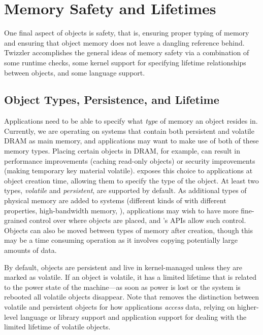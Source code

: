 \section{Memory Safety and Lifetimes}

One final aspect of objects is safety, that is, ensuring proper typing of memory and ensuring that object memory does
not leave a dangling reference behind. Twizzler accomplishes the general ideas of memory safety via a combination of
some runtime checks, some kernel support for specifying lifetime relationships between objects, and some language
support.

\subsection{Object Types, Persistence, and Lifetime}

Applications need to be able to specify what \emph{type} of memory an object resides in. Currently,
we are operating on systems that contain both persistent \NVM and volatile DRAM as main memory, and
applications may want to make use of both of these memory types. Placing certain objects in DRAM,
for example, can result in performance improvements (\eg caching read-only objects) or security
improvements (\eg making temporary key material volatile). \Twizzler exposes this choice to
applications at object creation time, allowing them to specify the type of the object. At least two
types, \emph{volatile} and \emph{persistent}, are supported by default. As additional types of physical memory
are added to systems (\eg different kinds of \NVM with different properties, high-bandwidth memory,
\etc), applications may wish to have more fine-grained control over where objects are placed, and
\Twizzler's APIs allow such control. Objects can also be moved between types of memory after
creation, though this may be a time consuming operation as it involves copying potentially large
amounts of data.

By default, objects are persistent and live in kernel-managed \NVM unless they are marked as
volatile. If an object is volatile, it has a limited lifetime that is related to the power state of
the machine---as soon as power is lost or the system is rebooted all volatile objects disappear.
Note that \Twizzler removes the distinction between volatile and persistent objects for how
applications \emph{access} data, relying on higher-level language or library support and application
support for dealing with the limited lifetime of volatile objects.

